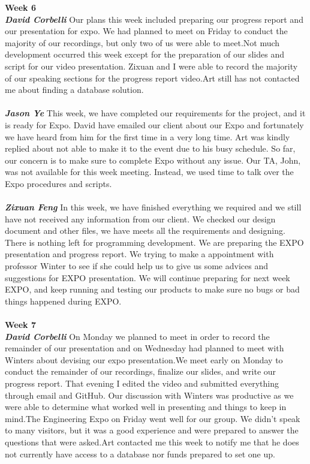 \documentclass[onecolumn, draftclsnofoot,10pt, compsoc]{IEEEtran}
\begin{document}
\textbf{Week 6}
\\ \textbf{\textit{David Corbelli}}
Our plans this week included preparing our progress report and our presentation for expo. We had planned to meet on Friday to conduct the majority of our recordings, but only two of us were able to meet.Not much development occurred this week except for the preparation of our slides and script for our video presentation. Zixuan and I were able to record the majority of our speaking sections for the progress report video.Art still has not contacted me about finding a database solution.\\ \\

\noindent\textbf{\textit{Jason Ye}}
This week, we have completed our requirements for the project, and it is ready for Expo. David have emailed our client about our Expo and fortunately we have heard from him for the first time in a very long time. Art was kindly replied about not able to make it to the event due to his busy schedule. So far, our concern is to make sure to complete Expo without any issue. Our TA, John, was not available for this week meeting. Instead, we used time to talk over the Expo procedures and scripts.\\ \\
\textbf{\textit{Zixuan Feng}}
In this week, we have finished everything we required and we still have not received any information from our client. We checked our design document and other files, we have meets all the requirements and designing. There is nothing left for programming development. We are preparing the EXPO presentation and progress report. We trying to make a appointment with professor Winter to see if she could help us to give us some advices and suggestions for EXPO presentation. We will continue preparing for next week EXPO, and keep running and testing our products to make sure no bugs or bad things happened during EXPO.\\ \\
\textbf{Week 7}
\\ \textbf{\textit{David Corbelli}}
On Monday we planned to meet in order to record the remainder of our presentation and on Wednesday had planned to meet with Winters about devising our expo presentation.We meet early on Monday to conduct the remainder of our recordings, finalize our slides, and write our progress report. That evening I edited the video and submitted everything through email and GitHub. Our discussion with Winters was productive as we were able to determine what worked well in presenting and things to keep in mind.The Engineering Expo on Friday went well for our group. We didn't speak to many visitors, but it was a good experience and were prepared to answer the questions that were asked.Art contacted me this week to notify me that he does not currently have access to a database nor funds prepared to set one up.\\ \\
\end{document}
